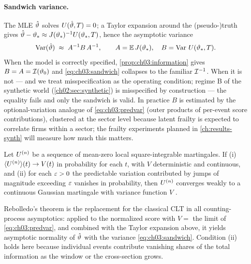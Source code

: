 \paragraph{Sandwich variance.}
The MLE $\hat{\vartheta}$ solves $U(\hat{\vartheta},T)=0$; a Taylor
expansion around the (pseudo-)truth gives $\hat{\vartheta} - \vartheta_*
\approx J(\vartheta_*)^{-1}U(\vartheta_*,T)$, hence the
asymptotic variance
\begin{equation}\label{eq:ch03:sandwich}
\operatorname{Var}(\hat{\vartheta}) \;\approx\; A^{-1} B\, A^{-1},
\qquad
A = \mathbb{E}\,J(\vartheta_*),
\quad
B = \operatorname{Var}\,U(\vartheta_*,T).
\end{equation}
When the model is correctly specified, \cref{prop:ch03:information} gives
$B = A = \mathcal{I}(\vartheta_0)$ and \cref{eq:ch03:sandwich} collapses to
the familiar $\mathcal{I}^{-1}$. When it is not --- and we treat
misspecification as the operating condition; regime B of the synthetic
world (\cref{ch02:sec:synthetic}) is misspecified by construction --- the
equality fails and only the sandwich is valid. In practice $B$ is
estimated by the optional-variation analogue of \cref{eq:ch03:predvar}
(outer products of per-event score contributions), clustered at the sector
level because latent frailty is expected to correlate firms within a
sector; the frailty experiments planned in \cref{ch:results-synth} will
measure how much this matters.

\begin{theorem}\label{thm:ch03:rebolledo}
Let $U^{(n)}$ be a sequence of mean-zero local square-integrable
martingales. If (i) $\langle U^{(n)}\rangle(t) \to V(t)$ in
probability for each $t$, with $V$ deterministic and continuous, and (ii)
for each $\varepsilon>0$ the predictable variation contributed by jumps of
magnitude exceeding $\varepsilon$ vanishes in probability, then
$U^{(n)}$ converges weakly to a continuous Gaussian martingale with
variance function $V$ \citep{abgk1993,andersengill1982}.
\end{theorem}

Rebolledo's theorem is the replacement for the classical CLT in all
counting-process asymptotics: applied to the normalized score with
$V = $ the limit of \cref{eq:ch03:predvar}, and combined with the Taylor
expansion above, it yields asymptotic normality of $\hat{\vartheta}$ with the
variance \cref{eq:ch03:sandwich}. Condition (ii) holds here because
individual events contribute vanishing shares of the total information as
the window or the cross-section grows.

